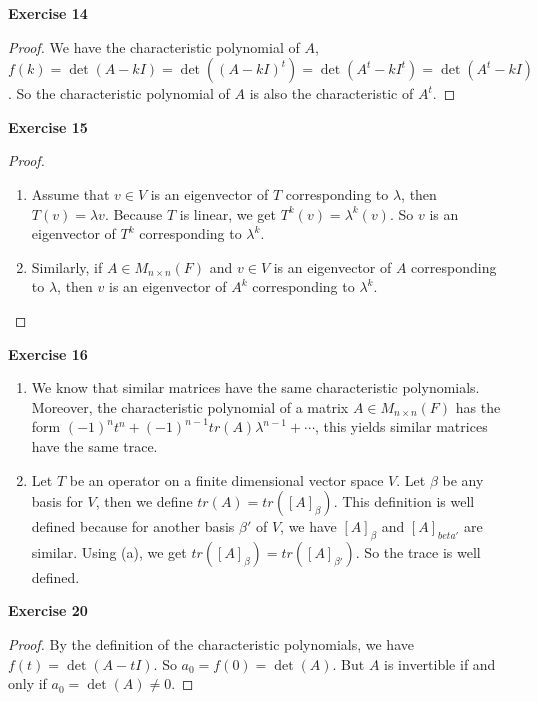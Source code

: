 \documentclass[12pt, a4paper]{article}
\theoremstyle{plain}
\newenvironment{exercise}[2][Exercise]
    { \begin{mdframed}[backgroundcolor=gray!20] \textbf{#1 #2} \\}
    {  \end{mdframed}}
\begin{document}
\begin{exercise}{14}

\end{exercise}
	\begin{proof}
	We have the characteristic polynomial of $A$, $f(k)=\det(A-kI)=\det((A-kI)^t)=\det(A^t-kI^t)=\det(A^t-kI)$. So the characteristic polynomial of $A$ is also the characteristic of $A^t$.
	\end{proof}

\begin{exercise}{15}

\end{exercise}
\begin{proof}
\hfill
\begin{enumerate}[label=(\alph*)]
\item Assume that $v\in V$ is an eigenvector of $T$ corresponding to $\lambda$, then $T(v)=\lambda v$. Because $T$ is linear, we get $T^k(v)=\lambda^k(v)$. So $v$ is an eigenvector of $T^k$ corresponding to $\lambda^k$.
\item Similarly, if $A\in M_{n\times n}(F)$ and $v\in V$ is an eigenvector of $A$ corresponding to $\lambda$, then $v$ is an eigenvector of $A^k$ corresponding to $\lambda^k$.
\end{enumerate}
\end{proof}

\begin{exercise}{16}

\end{exercise}
\hfill
\begin{enumerate}[label=(\alph*)]
\item We know that similar matrices have the same characteristic polynomials. Moreover, the characteristic polynomial of a matrix $A\in M_{n\times n}(F)$ has the form $(-1)^nt^n+ (-1)^{n-1}tr(A)\lambda^{n-1}+\cdots$, this yields similar matrices have the same trace.

\item Let $T$ be an operator on a finite dimensional vector space $V$. Let $\beta$ be any basis for $V$, then we define $tr(A)=tr([A]_\beta)$. This definition is well defined because for another basis $\beta'$ of $V$, we have $[A]_\beta$ and $[A]_{beta'}$ are similar. Using (a), we get $tr([A]_\beta)=tr([A]_{\beta'})$. So the trace is well defined.
\end{enumerate}

\begin{exercise}{20}

\end{exercise}
	\begin{proof}
	By the definition of the characteristic polynomials, we have $f(t)=\det(A-tI)$. So $a_0 = f(0)=\det(A)$. But $A$ is invertible if and only if $a_0 = \det(A)\neq 0$.
	\end{proof}
	
\end{document}
